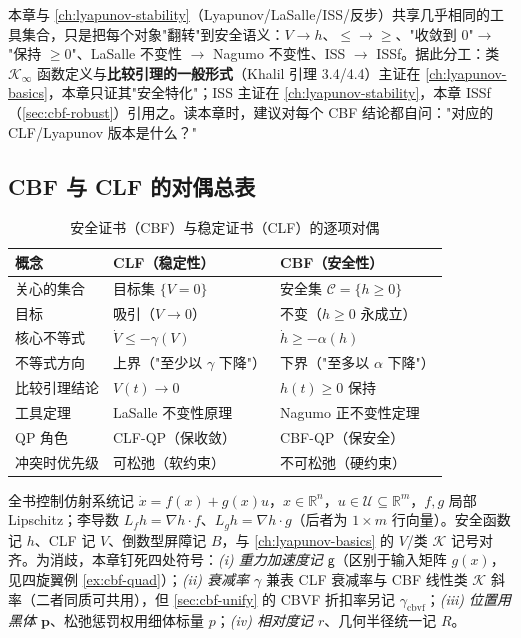 \begin{note}
本章与 \cref{ch:lyapunov-stability}（Lyapunov/LaSalle/ISS/反步）共享几乎相同的工具集合，只是把每个对象"翻转"到安全语义：$V\to h$、$\le\to\ge$、"收敛到 $0$"$\to$"保持 $\ge0$"、LaSalle 不变性 $\to$ Nagumo 不变性、ISS $\to$ ISSf。据此分工：类 $\mathcal K_\infty$ 函数定义与\textbf{比较引理的一般形式}（Khalil 引理 3.4/4.4）主证在 \cref{ch:lyapunov-basics}，本章只证其"安全特化"；ISS 主证在 \cref{ch:lyapunov-stability}，本章 ISSf（\cref{sec:cbf-robust}）引用之。读本章时，建议对每个 CBF 结论都自问："对应的 CLF/Lyapunov 版本是什么？"
\end{note}

\subsection*{CBF 与 CLF 的对偶总表}

\begin{table}[H]\centering\small
\caption{安全证书（CBF）与稳定证书（CLF）的逐项对偶}
\label{tab:cbf-clf-duality}
\begin{tabular}{lll}
\toprule
概念 & CLF（稳定性） & CBF（安全性） \\
\midrule
关心的集合 & 目标集 $\{V=0\}$ & 安全集 $\mathcal C=\{h\ge0\}$ \\
目标 & 吸引（$V\to0$） & 不变（$h\ge0$ 永成立） \\
核心不等式 & $\dot V\le-\gamma(V)$ & $\dot h\ge-\alpha(h)$ \\
不等式方向 & 上界（"至少以 $\gamma$ 下降"） & 下界（"至多以 $\alpha$ 下降"） \\
比较引理结论 & $V(t)\to0$ & $h(t)\ge0$ 保持 \\
工具定理 & LaSalle 不变性原理 & Nagumo 正不变性定理 \\
QP 角色 & CLF-QP（保收敛） & CBF-QP（保安全） \\
冲突时优先级 & 可松弛（软约束） & 不可松弛（硬约束） \\
\bottomrule
\end{tabular}
\end{table}

\begin{note}[本章记号约定]
全书控制仿射系统记 $\dot x=f(x)+g(x)u$，$x\in\mathbb R^n$，$u\in\mathcal U\subseteq\mathbb R^m$，$f,g$ 局部 Lipschitz；李导数 $L_fh=\nabla h\cdot f$、$L_gh=\nabla h\cdot g$（后者为 $1\times m$ 行向量）。安全函数记 $h$、CLF 记 $V$、倒数型屏障记 $B$，与 \cref{ch:lyapunov-basics} 的 $V$/类 $\mathcal K$ 记号对齐。为消歧，本章钉死四处符号：\emph{(i) 重力加速度记 $\mathsf g$}（区别于输入矩阵 $g(x)$，见四旋翼例 \cref{ex:cbf-quad}）；\emph{(ii) 衰减率 $\gamma$} 兼表 CLF 衰减率与 CBF 线性类 $\mathcal K$ 斜率（二者同质可共用），但 \cref{sec:cbf-unify} 的 CBVF 折扣率另记 $\gamma_{\mathrm{cbvf}}$；\emph{(iii) 位置用黑体 $\mathbf p$}、松弛惩罚权用细体标量 $p$；\emph{(iv) 相对度记 $r$}、几何半径统一记 $R$。
\end{note}

